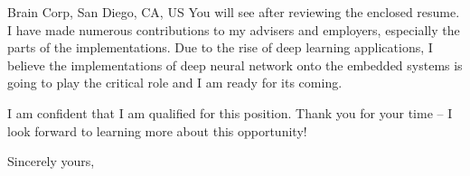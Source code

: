 \documentclass[12pt]{letter} %
\newcounter{comment}
\begin{document}
\begin{letter}{Brain Corp, San Diego, CA, US}
You will see after reviewing the enclosed resume.  I have made numerous contributions to my advisers
and employers, especially the parts of the implementations.  Due to the rise of deep learning applications, 
I believe the implementations of deep neural network onto the embedded systems is going to play the critical role and
I am ready for its coming. 

I am confident that I am qualified for this position. Thank you for your time -- I look forward to learning more about this opportunity!

\closing{Sincerely yours,}




\end{letter}
\end{document}
